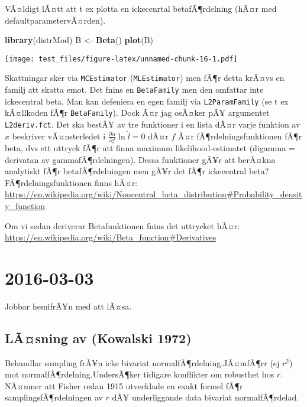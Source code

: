 \documentclass[]{article}
\newenvironment{Shaded}{\begin{snugshade}}{\end{snugshade}}
\newcommand{\KeywordTok}[1]{\textcolor[rgb]{0.13,0.29,0.53}{\textbf{{#1}}}}
\newcommand{\StringTok}[1]{\textcolor[rgb]{0.31,0.60,0.02}{{#1}}}
\newcommand{\NormalTok}[1]{{#1}}
\begin{document}
VÃ¤ldigt lÃ¤tt att t ex plotta en ickecenrtal betafÃ¶rdelning (hÃ¤r med
defaultparametervÃ¤rden).

\begin{Shaded}
\begin{Highlighting}[]
\KeywordTok{library}\NormalTok{(distrMod)}
\NormalTok{B <-}\StringTok{ }\KeywordTok{Beta}\NormalTok{()}
\KeywordTok{plot}\NormalTok{(B)}
\end{Highlighting}
\end{Shaded}

\texttt{[image: test\_files/figure-latex/unnamed-chunk-16-1.pdf]}

Skattningar sker via \texttt{MCEstimator} (\texttt{MLEstimator}) men
fÃ¶r detta krÃ¤vs en familj att skatta emot. Det fnins en
\texttt{BetaFamily} men den omfattar inte ickecentral beta. Man kan
defeniera en egen familj via \texttt{L2ParamFamily} (se t ex kÃ¤llkoden
fÃ¶r \texttt{BetaFamily}). Dock Ã¤r jag osÃ¤ker pÃ¥ argumentet
\texttt{L2deriv.fct}. Det ska bestÃ¥ av tre funktioner i en lista dÃ¤r
varje funktion av \(x\) beskriver vÃ¤nsterledet i
\(\frac{\partial \alpha}{\partial f} \ln{\hat{l}} = 0\) dÃ¤r \(f\) Ã¤r
fÃ¶rdelningsfunktionen fÃ¶r beta, dvs ett uttryck fÃ¶r att finna maximum
likelihood-estimatet (digamma = derivatan av gammafÃ¶rdelningen). Dessa
funktioner gÃ¥r att berÃ¤kna analytiskt fÃ¶r betafÃ¶rdelningen men gÃ¥r
det fÃ¶r ickecentral beta? FÃ¶rdelningsfunktionen finns hÃ¤r:
\url{https://en.wikipedia.org/wiki/Noncentral_beta_distribution\#Probability_density_function}

Om vi sedan deriverar Betafunktionen fnins det uttrycket hÃ¤r:
\url{https://en.wikipedia.org/wiki/Beta_function\#Derivatives}

\section{2016-03-03}\label{section-3}

Jobbar hemifrÃ¥n med att lÃ¤sa.

\subsection{LÃ¤sning av (Kowalski 1972)}\label{lasning-av-kowalski1972}

Behandlar sampling frÃ¥n icke bivariat normalfÃ¶rdelning.JÃ¤mfÃ¶rr (ej
\(r^2\)) mot normalfÃ¶rdelning.UndersÃ¶ker tidigare konflikter om
robusthet hos \(r\). NÃ¤mner att Fisher redan 1915 utvecklade en exakt
formel fÃ¶r samplingsfÃ¶rdelningen av \(r\) dÃ¥ underliggande data
bivariat normalfÃ¶rdelad.
\end{document}
